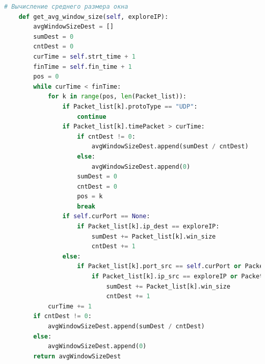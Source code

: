 \documentclass[bachelor, och, coursework]{SCWorks}
\begin{document}
\begin{lstlisting}[language=Python]
    # Вычисление среднего размера окна
    def get_avg_window_size(self, exploreIP):
        avgWindowSizeDest = []
        sumDest = 0
        cntDest = 0
        curTime = self.strt_time + 1
        finTime = self.fin_time + 1
        pos = 0
        while curTime < finTime:
            for k in range(pos, len(Packet_list)):
                if Packet_list[k].protoType == "UDP":
                    continue
                if Packet_list[k].timePacket > curTime:
                    if cntDest != 0:
                        avgWindowSizeDest.append(sumDest / cntDest)
                    else:
                        avgWindowSizeDest.append(0)
                    sumDest = 0
                    cntDest = 0 
                    pos = k
                    break
                if self.curPort == None:
                    if Packet_list[k].ip_dest == exploreIP:
                        sumDest += Packet_list[k].win_size
                        cntDest += 1
                else:
                    if Packet_list[k].port_src == self.curPort or Packet_list[k].port_dest == self.curPort:
                        if Packet_list[k].ip_src == exploreIP or Packet_list[k].ip_dest == exploreIP:
                            sumDest += Packet_list[k].win_size
                            cntDest += 1
            curTime += 1
        if cntDest != 0:
            avgWindowSizeDest.append(sumDest / cntDest)
        else:
            avgWindowSizeDest.append(0)
        return avgWindowSizeDest


\end{lstlisting}
\end{document}

